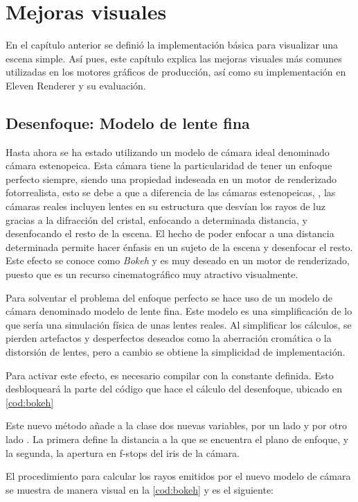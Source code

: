 \chapter{Mejoras visuales}
				
En el capítulo anterior se definió la implementación básica para visualizar una escena simple. Así pues, este capítulo explica las mejoras visuales más comunes utilizadas en los motores gráficos de producción, así como su implementación en Eleven Renderer y su evaluación.
	
\section{Desenfoque: Modelo de lente fina}
	
Hasta ahora se ha estado utilizando un modelo de cámara ideal denominado cámara estenopeica. Esta cámara tiene la particularidad de tener un enfoque perfecto siempre, siendo una propiedad indeseada en un motor de renderizado fotorrealista, esto se debe a que a diferencia de las cámaras estenopeicas, , las cámaras reales incluyen lentes en su estructura que desvían los rayos de luz gracias a la difracción del cristal, enfocando a determinada distancia, y desenfocando el resto de la escena. El hecho de poder enfocar a una distancia determinada permite hacer énfasis en un sujeto de la escena y desenfocar el resto. Este efecto se conoce como \emph{Bokeh} y es muy deseado en un motor de renderizado, puesto que es un recurso cinematográfico muy atractivo visualmente.

Para solventar el problema del enfoque perfecto se hace uso de un modelo de cámara denominado modelo de lente fina. Este modelo es una simplificación de lo que sería una simulación física de unas lentes reales. Al simplificar los cálculos, se pierden artefactos y desperfectos deseados como la aberración cromática o la distorsión de lentes, pero a cambio se obtiene la simplicidad de implementación.

Para activar este efecto, es necesario compilar con la constante  definida. Esto desbloqueará la parte del código que hace el cálculo del desenfoque, ubicado en \autoref{cod:bokeh} 
	
Este nuevo método añade a la clase  dos nuevas variables, por un lado  y por otro lado . La primera define la distancia a la que se encuentra el plano de enfoque, y la segunda, la apertura en f-stops del iris de la cámara. 

El procedimiento para calcular los rayos emitidos por el nuevo modelo de cámara se muestra de manera visual en la \autoref{cod:bokeh} y es el siguiente:

